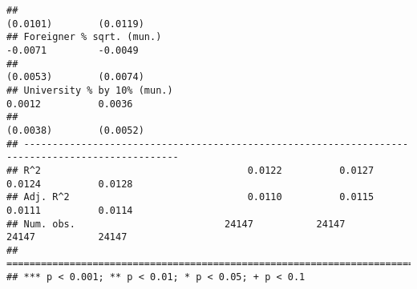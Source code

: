 \documentclass[
]{article}
\begin{document}
\begin{verbatim}
##                                                                       (0.0101)        (0.0119)   
## Foreigner % sqrt. (mun.)                                              -0.0071         -0.0049    
##                                                                       (0.0053)        (0.0074)   
## University % by 10% (mun.)                                             0.0012          0.0036    
##                                                                       (0.0038)        (0.0052)   
## -------------------------------------------------------------------------------------------------
## R^2                                    0.0122          0.0127          0.0124          0.0128    
## Adj. R^2                               0.0110          0.0115          0.0111          0.0114    
## Num. obs.                          24147           24147           24147           24147         
## =================================================================================================
## *** p < 0.001; ** p < 0.01; * p < 0.05; + p < 0.1
\end{verbatim}
\end{document}
